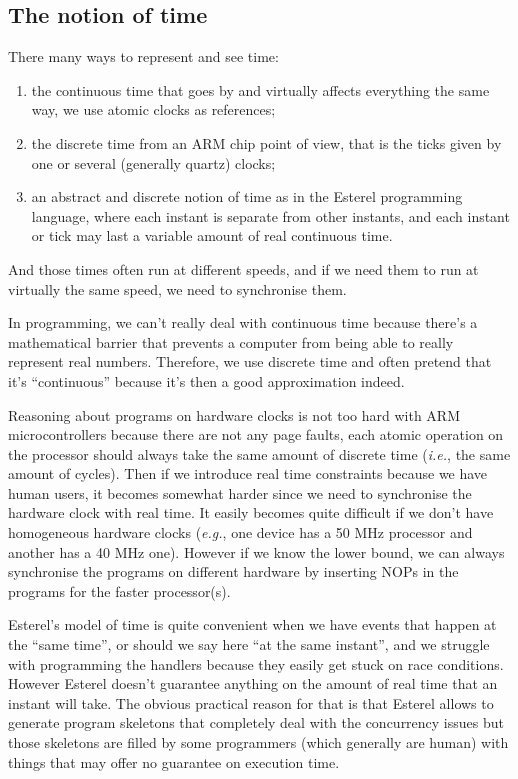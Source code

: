 \documentclass[12pt,twoside,a4paper]{article}
\def\eg{\emph{e.g.}}
\def\ie{\emph{i.e.}}
\begin{document}
\subsection{The notion of time}

There many ways to represent and see time:
\begin{enumerate}
\item  the  continuous  time   that  goes  by  and  virtually  affects
  everything the same way, we use atomic clocks as references;
\item the  discrete time from an ARM  chip point of view,  that is the
  ticks given by one or several (generally quartz) clocks;
\item  an abstract  and  discrete notion  of  time as  in the  Esterel
  programming   language\cite{Esterel1992,Esterel1999},   where   each
  instant is  separate from other  instants, and each instant  or tick
  may last a variable amount of real continuous time.
\end{enumerate}
And those times often run at different speeds, and if we need them to
run at virtually the same speed, we need to synchronise them.

In  programming, we  can't really  deal with  continuous  time because
there's  a mathematical barrier  that prevents  a computer  from being
able to really represent real numbers. Therefore, we use discrete time
and  often pretend  that it's  “continuous” because  it's then  a good
approximation indeed.

Reasoning about programs  on hardware clocks is not  too hard with ARM
microcontrollers because  there are not  any page faults,  each atomic
operation  on the  processor should  always  take the  same amount  of
discrete time (\ie,  the same amount of cycles).  Then if we introduce
real time constraints because we have human users, it becomes somewhat
harder since we need to synchronise the hardware clock with real time.
It  easily  becomes  quite  difficult  if we  don't  have  homogeneous
hardware clocks  (\eg, one device has  a 50 MHz  processor and another
has a 40 MHz  one). However if we know the lower  bound, we can always
synchronise the  programs on different  hardware by inserting  NOPs in
the programs for the faster processor(s).

Esterel's model of  time is quite convenient when  we have events that
happen  at  the “same  time”,  or  should we  say  here  “at the  same
instant”, and  we struggle with programming the  handlers because they
easily  get  stuck  on   race  conditions.   However  Esterel  doesn't
guarantee anything  on the  amount of real  time that an  instant will
take. The obvious practical reason  for that is that Esterel allows to
generate program  skeletons that completely deal  with the concurrency
issues  but those  skeletons  are filled  by  some programmers  (which
generally  are human)  with  things  that may  offer  no guarantee  on
execution time.
\end{document}
